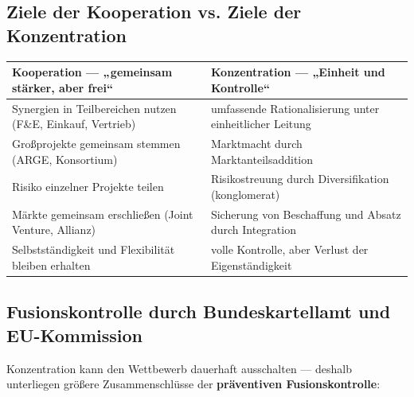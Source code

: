 \documentclass[11pt, a4paper]{article}
\begin{document}
\subsection{Ziele der Kooperation vs. Ziele der Konzentration}

\begin{center}
\begin{tabular}{p{6.8cm} p{6.8cm}}
\toprule
\textbf{Kooperation --- „gemeinsam stärker, aber frei``} & \textbf{Konzentration --- „Einheit und Kontrolle``}\\
\midrule
Synergien in Teilbereichen nutzen (F\&E, Einkauf, Vertrieb) & umfassende Rationalisierung unter einheitlicher Leitung\\
Großprojekte gemeinsam stemmen (ARGE, Konsortium) & Marktmacht durch Marktanteilsaddition\\
Risiko einzelner Projekte teilen & Risikostreuung durch Diversifikation (konglomerat)\\
Märkte gemeinsam erschließen (Joint Venture, Allianz) & Sicherung von Beschaffung und Absatz durch Integration\\
Selbstständigkeit und Flexibilität bleiben erhalten & volle Kontrolle, aber Verlust der Eigenständigkeit\\
\bottomrule
\end{tabular}
\end{center}

\subsection{Fusionskontrolle durch Bundeskartellamt und EU-Kommission}

Konzentration kann den Wettbewerb dauerhaft ausschalten --- deshalb unterliegen größere
Zusammenschlüsse der \textbf{präventiven Fusionskontrolle}:
\end{document}
